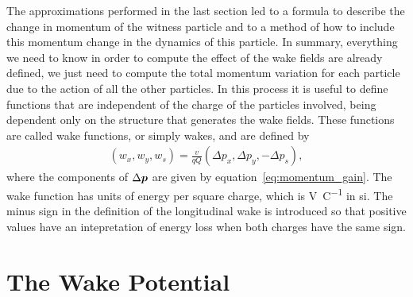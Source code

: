     The approximations performed in the last section led to a formula to describe the change in momentum of the witness particle and to a method of how to include this momentum change in the dynamics of this particle. In summary, everything we need to know in order to compute the effect of the wake fields are already defined, we just need to compute the total momentum variation for each particle due to the action of all the other particles. In this process it is useful to define functions that are independent of the charge of the particles involved, being dependent only on the structure that generates the wake fields. These functions are called wake functions, or simply wakes, and are defined by
    \begin{align}\label{eq:wake_definition}
	  	\left(w_x, w_y, w_s\right) =
	  	\frac{v}{qQ} \left(\Delta p_x, \Delta p_y, -\Delta p_s\right),
    \end{align}
    where the components of $\Delta\boldsymbol{p}$ are given by equation~\eqref{eq:momentum_gain}. The wake function has units of energy per square charge, which is \si{\volt\per\coulomb} in \gls{si}. The minus sign in the definition of the longitudinal wake is introduced so that positive values have an intepretation of energy loss when both charges have the same sign.

\section{The Wake Potential}


